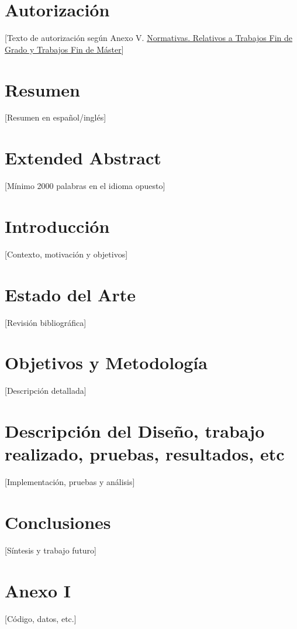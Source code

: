 \documentclass[12pt, a4paper]{article}
\begin{document}
\newpage
\section*{Autorización}
[Texto de autorización según Anexo V.  \href{https://www.um.es/web/informatica/conoce-la-facultad/normativa}{Normativas. Relativos a Trabajos Fin de Grado y Trabajos Fin de Máster}]

\newpage
\section*{Resumen}
  [Resumen en español/inglés]

\section*{Extended Abstract}
[Mínimo 2000 palabras en el idioma opuesto]

\newpage
\tableofcontents

\newpage
\section{Introducción}
[Contexto, motivación y objetivos]
\section{Estado del Arte}
[Revisión bibliográfica]

\section{Objetivos y Metodología}
[Descripción detallada]

\section{Descripción del Diseño, trabajo realizado, pruebas, resultados, etc}
[Implementación, pruebas y análisis]

\section{Conclusiones}
[Síntesis y trabajo futuro]

\cite{ejemplo1}
\cite{ejemplo2}
\cite{ejemplo3}

\newpage



\appendix
\section{Anexo I}
[Código, datos, etc.]
\end{document}
